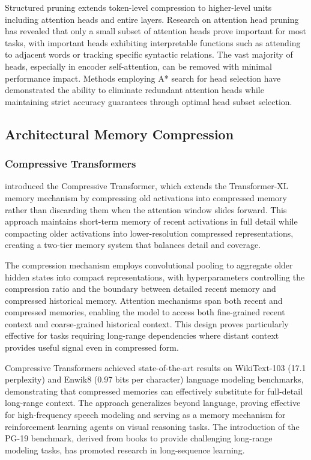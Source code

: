 Structured pruning extends token-level compression to higher-level units including attention heads and entire layers. Research on attention head pruning has revealed that only a small subset of attention heads prove important for most tasks, with important heads exhibiting interpretable functions such as attending to adjacent words or tracking specific syntactic relations. The vast majority of heads, especially in encoder self-attention, can be removed with minimal performance impact. Methods employing A* search for head selection have demonstrated the ability to eliminate redundant attention heads while maintaining strict accuracy guarantees through optimal head subset selection.

\subsection{Architectural Memory Compression}

\subsubsection{Compressive Transformers}

\citet{rae2020compressive} introduced the Compressive Transformer, which extends the Transformer-XL memory mechanism by compressing old activations into compressed memory rather than discarding them when the attention window slides forward. This approach maintains short-term memory of recent activations in full detail while compacting older activations into lower-resolution compressed representations, creating a two-tier memory system that balances detail and coverage.

The compression mechanism employs convolutional pooling to aggregate older hidden states into compact representations, with hyperparameters controlling the compression ratio and the boundary between detailed recent memory and compressed historical memory. Attention mechanisms span both recent and compressed memories, enabling the model to access both fine-grained recent context and coarse-grained historical context. This design proves particularly effective for tasks requiring long-range dependencies where distant context provides useful signal even in compressed form.

Compressive Transformers achieved state-of-the-art results on WikiText-103 (17.1 perplexity) and Enwik8 (0.97 bits per character) language modeling benchmarks, demonstrating that compressed memories can effectively substitute for full-detail long-range context. The approach generalizes beyond language, proving effective for high-frequency speech modeling and serving as a memory mechanism for reinforcement learning agents on visual reasoning tasks. The introduction of the PG-19 benchmark, derived from books to provide challenging long-range modeling tasks, has promoted research in long-sequence learning.

